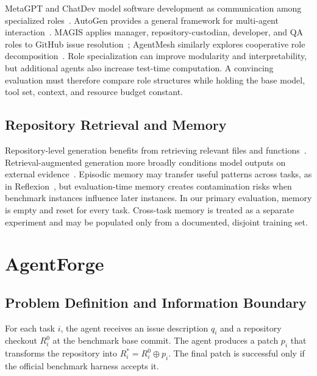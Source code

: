 \documentclass[journal]{IEEEtran}
\begin{document}
MetaGPT and ChatDev model software development as communication among specialized roles~\cite{hong2023metagpt,qian2023chatdev}. AutoGen provides a general framework for multi-agent interaction~\cite{wu2023autogen}. MAGIS applies manager, repository-custodian, developer, and QA roles to GitHub issue resolution~\cite{tao2024magis}; AgentMesh similarly explores cooperative role decomposition~\cite{khanzadeh2025agentmesh}. Role specialization can improve modularity and interpretability, but additional agents also increase test-time computation. A convincing evaluation must therefore compare role structures while holding the base model, tool set, context, and resource budget constant.

\subsection{Repository Retrieval and Memory}

Repository-level generation benefits from retrieving relevant files and functions~\cite{zhang2023repocoder,shrivastava2023repofusion}. Retrieval-augmented generation more broadly conditions model outputs on external evidence~\cite{lewis2020rag}. Episodic memory may transfer useful patterns across tasks, as in Reflexion~\cite{shinn2023reflexion}, but evaluation-time memory creates contamination risks when benchmark instances influence later instances. In our primary evaluation, memory is empty and reset for every task. Cross-task memory is treated as a separate experiment and may be populated only from a documented, disjoint training set.

\section{AgentForge}
\label{sec:method}

\subsection{Problem Definition and Information Boundary}

For each task $i$, the agent receives an issue description $q_i$ and a repository checkout $R_i^0$ at the benchmark base commit. The agent produces a patch $p_i$ that transforms the repository into $R_i^*=R_i^0\oplus p_i$. The final patch is successful only if the official benchmark harness accepts it.
\end{document}
